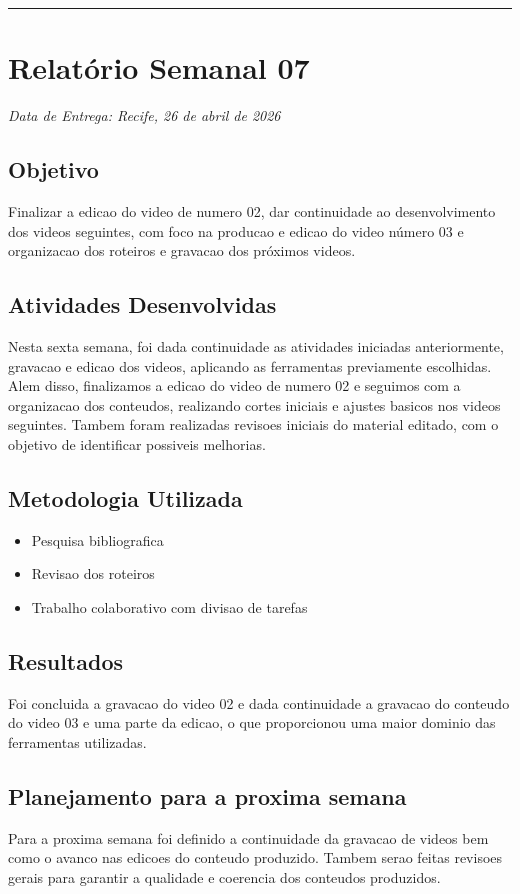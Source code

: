 \bigskip
\hrule
\bigskip

\section{Relatório Semanal 07}
{\centering\noindent\textit{Data de Entrega: Recife, 26 de abril de 2026}\par}\bigskip

\subsection{Objetivo}
Finalizar a edicao do video de numero 02, dar continuidade ao desenvolvimento dos videos seguintes, com foco na producao e edicao do video número 03 e organizacao dos roteiros e gravacao dos próximos videos.

\subsection{Atividades Desenvolvidas}
Nesta sexta semana, foi dada continuidade as atividades iniciadas anteriormente, gravacao e edicao dos videos, aplicando as ferramentas previamente escolhidas. Alem disso, finalizamos a edicao do video de numero 02 e seguimos com a organizacao dos conteudos, realizando cortes iniciais e ajustes basicos nos videos seguintes. Tambem foram realizadas revisoes iniciais do material editado, com o objetivo de identificar possiveis melhorias.

\subsection{Metodologia Utilizada}
\begin{itemize}
    \item Pesquisa bibliografica
    \item Revisao dos roteiros
    \item Trabalho colaborativo com divisao de tarefas
\end{itemize}

\subsection{Resultados}
Foi concluida a gravacao do video 02 e dada continuidade a gravacao do conteudo do video 03 e uma parte da edicao, o que proporcionou uma maior dominio das ferramentas utilizadas.

\subsection{Planejamento para a proxima semana}
Para a proxima semana foi definido a continuidade da gravacao de videos bem como o avanco nas edicoes do conteudo produzido. Tambem serao feitas revisoes gerais para garantir a qualidade e coerencia dos conteudos produzidos.

